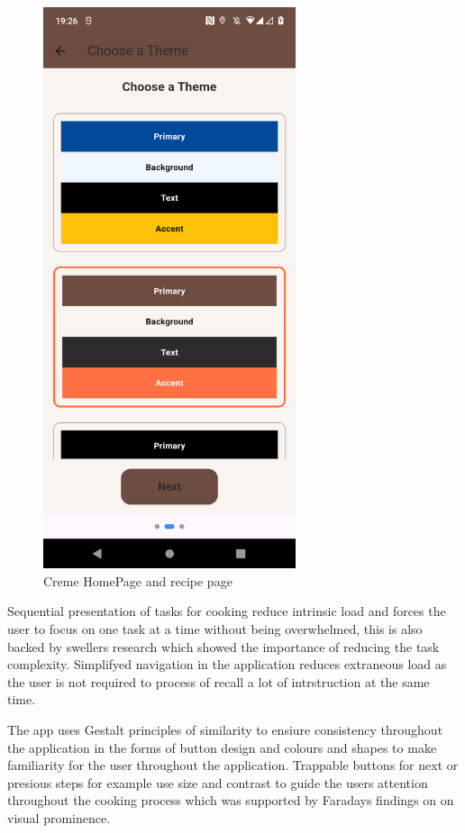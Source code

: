 \documentclass[]{project_interim}
\begin{document}
\begin{figure}[ht!]
\begin{minipage}[t]{0.4\textwidth}
    \includegraphics[width=20em]{colourPaletteSelection.png}
  \end{minipage}
  \caption{Creme HomePage and recipe page}
  \label{fig:1}
\end{figure}

\newpage


Sequential presentation of tasks for cooking reduce intrinsic load and forces the user to focus on one task at a time without being overwhelmed, this is also backed by swellers research which showed the importance of reducing the task complexity.
Simplifyed navigation in the application reduces extraneous load as the user is not required to process of recall a lot of intrstruction at the same time.

The app uses Gestalt principles of similarity to ensiure consistency throughout the application in the forms of button design and colours and shapes to make familiarity for the user throughout the application.
Trappable buttons for next or presious steps for example use size and contrast to guide the users attention throughout the cooking process which was supported by Faradays findings on on visual prominence.
\end{document}
